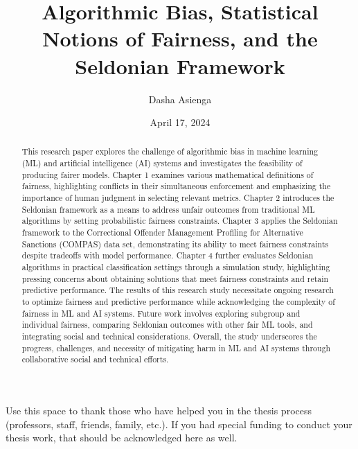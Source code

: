 \documentclass[12pt, twoside]{amherstthesis}
\title{Algorithmic Bias, Statistical Notions of Fairness, and the Seldonian Framework}
\author{Dasha Asienga}
\date{April 17, 2024}
\begin{document}
\doublespace
  \maketitle

\frontmatter %
\pagestyle{fancyplain}

  \begin{abstract}
    This research paper explores the challenge of algorithmic bias in machine learning (ML) and artificial intelligence (AI) systems and investigates the feasibility of producing fairer models. Chapter 1 examines various mathematical definitions of fairness, highlighting conflicts in their simultaneous enforcement and emphasizing the importance of human judgment in selecting relevant metrics. Chapter 2 introduces the Seldonian framework as a means to address unfair outcomes from traditional ML algorithms by setting probabilistic fairness constraints. Chapter 3 applies the Seldonian framework to the Correctional Offender Management Profiling for Alternative Sanctions (COMPAS) data set, demonstrating its ability to meet fairness constraints despite tradeoffs with model performance. Chapter 4 further evaluates Seldonian algorithms in practical classification settings through a simulation study, highlighting pressing concerns about obtaining solutions that meet fairness constraints and retain predictive performance. The results of this research study necessitate ongoing research to optimize fairness and predictive performance while acknowledging the complexity of fairness in ML and AI systems. Future work involves exploring subgroup and individual fairness, comparing Seldonian outcomes with other fair ML tools, and integrating social and technical considerations. Overall, the study underscores the progress, challenges, and necessity of mitigating harm in ML and AI systems through collaborative social and technical efforts.
  \end{abstract}
  \begin{acknowledgments}
    Use this space to thank those who have helped you in the thesis process (professors, staff, friends, family, etc.). If you had special funding to conduct your thesis work, that should be acknowledged here as well.
  \end{acknowledgments}

  \hypersetup{linkcolor=black}
  \setcounter{tocdepth}{2}
  \tableofcontents
\end{document}
